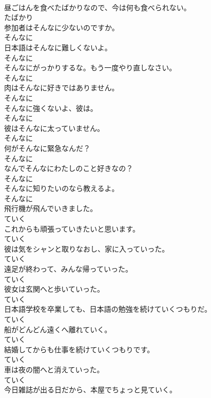 \documentclass[8pt]{extreport}
\begin{document}
\begin{CJK}{UTF8}{min}
\\	昼ごはんを食べたばかりなので、今は何も食べられない。	
\\	たばかり	
\\	参加者はそんなに少ないのですか。	
\\	そんなに	
\\	日本語はそんなに難しくないよ。	
\\	そんなに	
\\	そんなにがっかりするな。もう一度やり直しなさい。	
\\	そんなに	
\\	肉はそんなに好きではありません。	
\\	そんなに	
\\	そんなに強くないよ、彼は。	
\\	そんなに	
\\	彼はそんなに太っていません。	
\\	そんなに	
\\	何がそんなに緊急なんだ？	
\\	そんなに	
\\	なんでそんなにわたしのこと好きなの？	
\\	そんなに	
\\	そんなに知りたいのなら教えるよ。	
\\	そんなに	
\\	飛行機が飛んでいきました。	
\\	ていく	
\\	これからも頑張っていきたいと思います。	
\\	ていく	
\\	彼は気をシャンと取りなおし、家に入っていった。	
\\	ていく	
\\	遠足が終わって、みんな帰っていった。	
\\	ていく	
\\	彼女は玄関へと歩いていった。	
\\	ていく	
\\	日本語学校を卒業しても、日本語の勉強を続けていくつもりだ。	
\\	ていく	
\\	船がどんどん遠くへ離れていく。	
\\	ていく	
\\	結婚してからも仕事を続けていくつもりです。	
\\	ていく	
\\	車は夜の闇へと消えていった。	
\\	ていく	
\\	今日雑誌が出る日だから、本屋でちょっと見ていく。	

\end{CJK}
\end{document}
